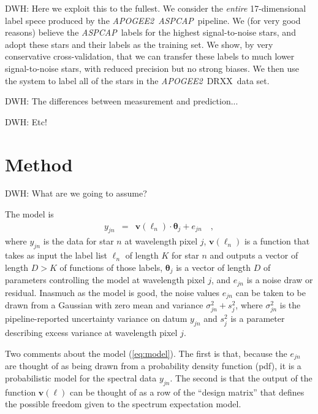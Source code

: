 \documentclass[12pt,preprint]{aastex}
\newcommand{\project}[1]{\textsl{#1}}
\newcommand{\acronym}[1]{{\small{#1}}}
\newcommand{\apogee}{\project{\acronym{APOGEE2}}}
\newcommand{\aspcap}{\project{\acronym{ASPCAP}}}
\newcommand{\dr}{\acronym{DRXX}}
\newcommand{\Dvector}[1]{\boldsymbol{#1}}
\newcommand{\vectheta}{\Dvector{\theta}}
\newcommand{\vecv}{\Dvector{v}}
\begin{document}
DWH: Here we exploit this to the fullest.
We consider the \emph{entire} 17-dimensional label spece produced by
the \apogee\ \aspcap\ pipeline.
We (for very good reasons) believe the \aspcap\ labels for the highest
signal-to-noise stars, and adopt these stars and their labels as the
training set.
We show, by very conservative cross-validation, that we can transfer these
labels to much lower signal-to-noise stars, with reduced precision but no
strong biases.
We then use the system to label all of the stars in the \apogee\ \dr\ data set.

DWH: The differences between measurement and prediction...

DWH: Etc!

\section{Method}

DWH: What are we going to assume?

The model is
\begin{eqnarray}
  y_{jn} &=& \vecv(\ell_n)\cdot\vectheta_j + e_{jn}
  \label{eq:model}\quad ,
\end{eqnarray}
where $y_{jn}$ is the data for star $n$ at wavelength pixel $j$,
$\vecv(\ell_n)$ is a function that takes as input
the label list $\ell_n$ of length $K$ for star $n$
and outputs a vector of length $D>K$ of functions of those labels,
$\vectheta_j$ is a vector of length $D$ of parameters controlling the model at wavelength pixel $j$,
and $e_{jn}$ is a noise draw or residual.
Inasmuch as the model is good, the noise values $e_{jn}$ can be taken to be
drawn from a Gaussian with zero mean and variance $\sigma^2_{jn}+s^2_j$,
where $\sigma^2_{jn}$ is the pipeline-reported uncertainty variance on datum
$y_{jn}$ and $s^2_j$ is a parameter describing excess variance at wavelength pixel $j$.

Two comments about the model (\ref{eq:model}).
The first is that, because the $e_{jn}$ are thought of as being drawn from a 
probability density function (pdf), it is a probabilistic model for the spectral
data $y_{jn}$.
The second is that the output of the function $\vecv(\ell)$ can be thought
of as a row of the ``design matrix'' that defines the possible freedom
given to the spectrum expectation model.
\end{document}
